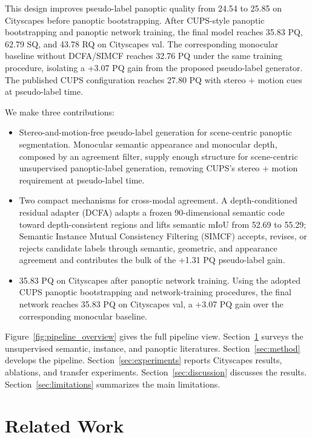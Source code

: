 \documentclass[10pt,twocolumn,letterpaper]{article}
\begin{document}
This design improves pseudo-label panoptic quality from 24.54 to 25.85 on Cityscapes before panoptic bootstrapping. After CUPS-style panoptic bootstrapping and panoptic network training, the final model reaches 35.83 PQ, 62.79 SQ, and 43.78 RQ on Cityscapes val. The corresponding monocular baseline without DCFA/SIMCF reaches 32.76 PQ under the same training procedure, isolating a +3.07 PQ gain from the proposed pseudo-label generator. The published CUPS configuration reaches 27.80 PQ with stereo + motion cues at pseudo-label time.

We make three contributions:
\begin{itemize}
\item Stereo-and-motion-free pseudo-label generation for scene-centric panoptic segmentation. Monocular semantic appearance and monocular depth, composed by an agreement filter, supply enough structure for scene-centric unsupervised panoptic-label generation, removing CUPS's stereo + motion requirement at pseudo-label time.
\item Two compact mechanisms for cross-modal agreement. A depth-conditioned residual adapter (DCFA) adapts a frozen 90-dimensional semantic code toward depth-consistent regions and lifts semantic mIoU from 52.69 to 55.29; Semantic Instance Mutual Consistency Filtering (SIMCF) accepts, revises, or rejects candidate labels through semantic, geometric, and appearance agreement and contributes the bulk of the +1.31 PQ pseudo-label gain.
\item 35.83 PQ on Cityscapes after panoptic network training. Using the adopted CUPS panoptic bootstrapping and network-training procedures, the final network reaches 35.83 PQ on Cityscapes val, a +3.07 PQ gain over the corresponding monocular baseline.
\end{itemize}

Figure~\ref{fig:pipeline_overview} gives the full pipeline view. Section~\ref{sec:related} surveys the unsupervised semantic, instance, and panoptic literatures. Section~\ref{sec:method} develops the pipeline. Section~\ref{sec:experiments} reports Cityscapes results, ablations, and transfer experiments. Section~\ref{sec:discussion} discusses the results. Section~\ref{sec:limitations} summarizes the main limitations.

\section{Related Work}
\label{sec:related}
\end{document}
